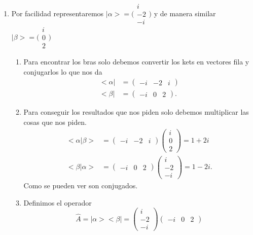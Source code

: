 \documentclass[12pt]{exam}
\begin{document}
\begin{enumerate}
\begin{enumerate}
    \end{enumerate}
  \item Por facilidad representaremos $|\alpha> = \bigl(\begin{smallmatrix}
i \\ -2 \\-i
\end{smallmatrix} \bigr)$ y de manera similar $|\beta> = \bigl(\begin{smallmatrix}
i\\0\\2
\end{smallmatrix}\bigr)$
\begin{enumerate}
  \item Para encontrar los bras solo debemos convertir los kets en vectores fila y conjugarlos lo que nos da
    \begin{align*}
      <\alpha| &= \begin{pmatrix} 
	-i & -2 & i
      \end{pmatrix}\\
	<\beta| &= \begin{pmatrix} 
	-i & 0 & 2
      \end{pmatrix} 
    .\end{align*}
  \item Para conseguir los resultados que nos piden solo debemos multiplicar las cosas que nos piden.
    \begin{align*}
      <\alpha|\beta> &= \begin{pmatrix} -i & -2 & i \end{pmatrix} \begin{pmatrix} i \\ 0 \\ 2 \end{pmatrix} = 1+2i\\
      <\beta|\alpha> &= \begin{pmatrix} -i & 0 & 2 \end{pmatrix} \begin{pmatrix} i \\ -2 \\ -i \end{pmatrix} = 1-2i
    .\end{align*}
    Como se pueden ver son conjugados.
  \item Definimos el operador \[\hat{A}=|\alpha><\beta| = \begin{pmatrix}
i \\ -2 \\-i
\end{pmatrix}\begin{pmatrix} 
-i & 0 & 2
\end{pmatrix} \]


\end{enumerate}
\end{enumerate}
\end{document}
